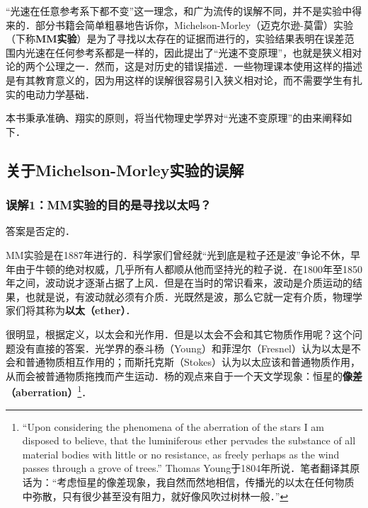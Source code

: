 
“光速在任意参考系下都不变”这一理念，和广为流传的误解不同，并不是实验中得来的．部分书籍会简单粗暴地告诉你，Michelson-Morley（迈克尔逊-莫雷）实验（下称\textbf{MM实验}）是为了寻找以太存在的证据而进行的，实验结果表明在误差范围内光速在任何参考系都是一样的，因此提出了“光速不变原理”，也就是狭义相对论的两个公理之一．然而，这是对历史的错误描述．一些物理课本使用这样的描述是有其教育意义的，因为用这样的误解很容易引入狭义相对论，而不需要学生有扎实的电动力学基础．

本书秉承准确、翔实的原则，将当代物理史学界对“光速不变原理”的由来阐释如下．

\subsection{关于Michelson-Morley实验的误解}

\subsubsection{误解1：MM实验的目的是寻找以太吗？}

答案是否定的．

MM实验是在1887年进行的．科学家们曾经就“光到底是粒子还是波”争论不休，早年由于牛顿的绝对权威，几乎所有人都顺从他而坚持光的粒子说．在1800年至1850年之间，波动说才逐渐占据了上风．但是在当时的常识看来，波动是介质运动的结果，也就是说，有波动就必须有介质．光既然是波，那么它就一定有介质，物理学家们将其称为\textbf{以太（ether）}．

很明显，根据定义，以太会和光作用．但是以太会不会和其它物质作用呢？这个问题没有直接的答案．光学界的泰斗杨（Young）和菲涅尔（Fresnel）认为以太是不会和普通物质相互作用的；而斯托克斯（Stokes）认为以太应该和普通物质作用，从而会被普通物质拖拽而产生运动．杨的观点来自于一个天文学现象：恒星的\textbf{像差（aberration）}\footnote{“Upon considering the phenomena
of the aberration of the stars I am disposed to believe, that the luminiferous ether pervades the substance of all material bodies with little or no resistance, as freely perhaps as the wind passes through a grove of trees.” Thomas Young于1804年所说．笔者翻译其原话为：“考虑恒星的像差现象，我自然而然地相信，传播光的以太在任何物质中弥散，只有很少甚至没有阻力，就好像风吹过树林一般．”}．


